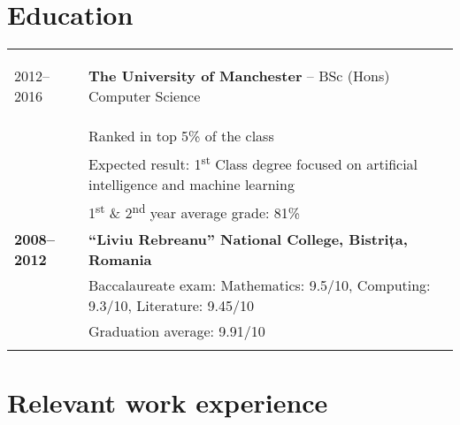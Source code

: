 \documentclass[11pt,a4paper]{article}
\begin{document}
  \begin{tabu} to

  \end{tabu}





\section*{Education}

  \begin{tabu} to 

   2012--2016 & \textbf{The University of Manchester} -- BSc (Hons) Computer Science\\
  & Ranked in top 5\% of the class \\
  & Expected result: 1\textsuperscript{st} Class degree focused on artificial intelligence and machine learning\\
  & 1\textsuperscript{st} \& 2\textsuperscript{nd} year average grade: 81\%\vspace{5pt}\\

   2008--2012 & \bf ``Liviu Rebreanu'' National College, Bistrița, Romania\\
  & Baccalaureate exam: Mathematics: 9.5/10, Computing: 9.3/10, Literature: 9.45/10\\
  & Graduation average: 9.91/10\\
  \end{tabu}

\section*{Relevant work experience}
\end{document}

